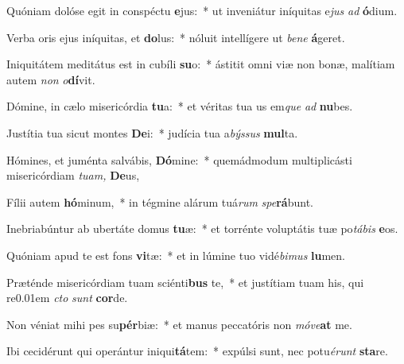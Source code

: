 \item Quóniam dolóse egit in conspéctu \textbf{e}jus:~* ut inveniátur iníquitas e\textit{jus} \textit{ad} \textbf{ó}dium.
\item Verba oris ejus iníquitas, et \textbf{do}lus:~* nóluit intellígere ut \textit{bene} \textbf{á}geret.
\item Iniquitátem meditátus est in cubíli \textbf{su}o:~* ástitit omni viæ non bonæ, malítiam autem \textit{non} \textit{o}\textbf{dí}vit.
\item Dómine, in cælo misericórdia \textbf{tu}a:~* et véritas tua us em\textit{que} \textit{ad} \textbf{nu}bes.
\item Justítia tua sicut montes \textbf{De}i:~* judícia tua a\textit{býssus} \textbf{mul}ta.
\item Hómines, et juménta salvábis, \textbf{Dó}mine:~* quemádmodum multiplicásti misericórdiam \textit{tuam,} \textbf{De}us,
\item Fílii autem \textbf{hó}minum,~* in tégmine alárum tuá\textit{rum} \textit{spe}\textbf{rá}bunt.
\item Inebriabúntur ab ubertáte domus \textbf{tu}æ:~* et torrénte voluptátis tuæ po\textit{tábis} \textbf{e}os.
\item Quóniam apud te est fons \textbf{vi}tæ:~* et in lúmine tuo vidé\textit{bimus} \textbf{lu}men.
\item Præténde misericórdiam tuam sciénti\textbf{bus} te,~* et justítiam tuam his, qui re\kern0.01em \textit{cto} \textit{sunt} \textbf{cor}de.
\item Non véniat mihi pes su\textbf{pér}biæ:~* et manus peccatóris non \textit{móve}\textbf{at} me.
\item Ibi cecidérunt qui operántur iniqui\textbf{tá}tem:~* expúlsi sunt, nec potu\textit{érunt} \textbf{sta}re.
